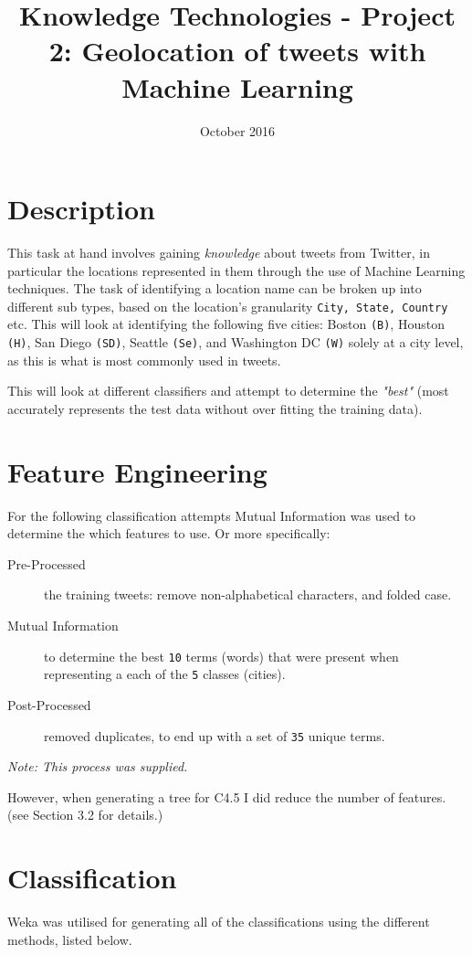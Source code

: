 \documentclass[a4paper]{article}
\title{Knowledge Technologies - Project 2: Geolocation of tweets with Machine Learning}
\date{October 2016}
\newcommand\wordcount{
    \immediate\write18{texcount -sub=section \jobname.tex  | grep "Section" | sed -e 's/+.*//' | sed -n \thesection p > 'count.txt'}
(words)}
\begin{document}
\maketitle

\section{Description}
This task at hand involves gaining \textit{knowledge} about tweets from Twitter, in particular the locations represented in them through the use of Machine Learning techniques.
The task of identifying a location name can be broken up into different sub types, based on the location's granularity \texttt{City, State, Country} etc. \cite{nadeau2007survey} This will look at identifying the following five cities:  Boston \texttt{(B)}, Houston \texttt{(H)}, San Diego \texttt{(SD)}, Seattle \texttt{(Se)}, and Washington DC \texttt{(W)} solely at a city level, as this is what is most commonly used in tweets.

This will look at different classifiers and attempt to determine the \textit{"best"} (most accurately represents the test data without over fitting the training data).
\section{Feature Engineering}
For the following classification attempts Mutual Information was used to determine the which features to use. Or more specifically:
\begin{description}
  \item [Pre-Processed] the training tweets: remove non-alphabetical characters, and folded case.
  \item [Mutual Information] to determine the best \texttt{10} terms (words) that were present when representing a each of  the \texttt{5} classes (cities).
  \item [Post-Processed] removed duplicates, to end up with a set of \texttt{35} unique terms.
\end{description}
\textit{Note: This process was supplied.}

However, when generating a tree for C4.5  I did reduce the number of features. (see Section 3.2 for details.)

\section{Classification}
Weka \cite{Weka} was utilised for  generating all of the classifications using the different methods, listed below.
\end{document}
